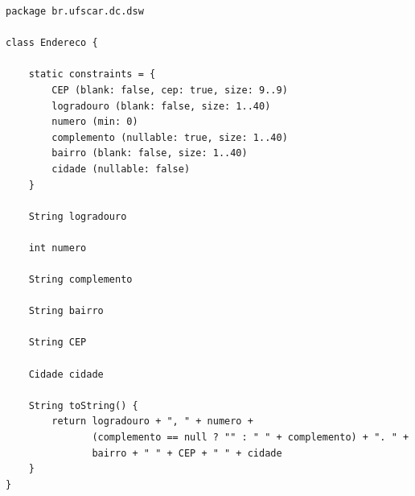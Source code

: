 \begin{lstlisting}[caption=Classe  de  domínio  {\bf  Endereco}, frame  =  trBL,
    float=htbp, label=codEndereco]
package br.ufscar.dc.dsw

class Endereco {

    static constraints = {
        CEP (blank: false, cep: true, size: 9..9)
        logradouro (blank: false, size: 1..40)
        numero (min: 0)
        complemento (nullable: true, size: 1..40)
        bairro (blank: false, size: 1..40)
        cidade (nullable: false)
    }
    
    String logradouro
    
    int numero
    
    String complemento
    
    String bairro
    
    String CEP
    
    Cidade cidade
    
    String toString() {
        return logradouro + ", " + numero + 
               (complemento == null ? "" : " " + complemento) + ". " + 
               bairro + " " + CEP + " " + cidade 
    }
}
\end{lstlisting}

\hspace{1cm}\\
\hspace{1cm}\\

